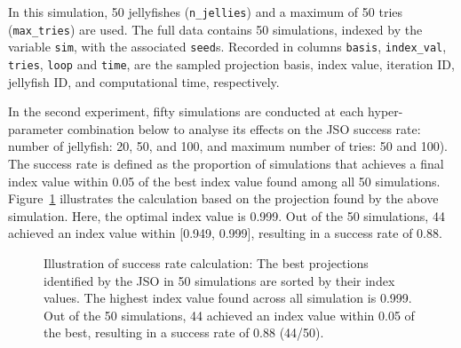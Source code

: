\documentclass[
  number,
  preprint,
  3p]{elsarticle}
\begin{document}
In this simulation, 50 jellyfishes (\texttt{n\_jellies}) and a maximum
of 50 tries (\texttt{max\_tries}) are used. The full data contains 50
simulations, indexed by the variable \texttt{sim}, with the associated
\texttt{seed}s. Recorded in columns \texttt{basis}, \texttt{index\_val},
\texttt{tries}, \texttt{loop} and \texttt{time}, are the sampled
projection basis, index value, iteration ID, jellyfish ID, and
computational time, respectively.

In the second experiment, fifty simulations are conducted at each
hyper-parameter combination below to analyse its effects on the JSO
success rate: number of jellyfish: 20, 50, and 100, and maximum number
of tries: 50 and 100). The success rate is defined as the proportion of
simulations that achieves a final index value within 0.05 of the best
index value found among all 50 simulations.
Figure~\ref{fig-success-rate} illustrates the calculation based on the
projection found by the above simulation. Here, the optimal index value
is 0.999. Out of the 50 simulations, 44 achieved an index value within
{[}0.949, 0.999{]}, resulting in a success rate of 0.88.

\begin{figure}


\caption{\label{fig-success-rate}Illustration of success rate
calculation: The best projections identified by the JSO in 50
simulations are sorted by their index values. The highest index value
found across all simulation is 0.999. Out of the 50 simulations, 44
achieved an index value within 0.05 of the best, resulting in a success
rate of 0.88 (44/50).}

\end{figure}%
\end{document}

